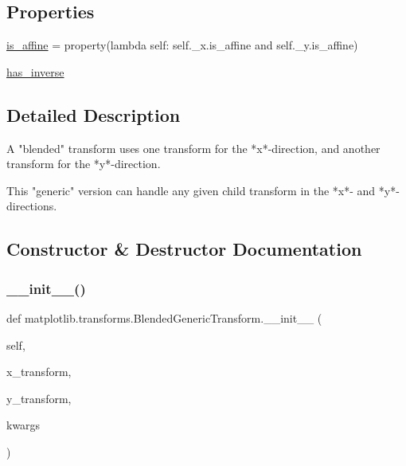 \subsection*{Properties}
\begin{DoxyCompactItemize}
\item 
\hyperlink{classmatplotlib_1_1transforms_1_1BlendedGenericTransform_a96ce5f24de76a1b9abf60d173df41fe6}{is\+\_\+affine} = property(lambda self\+: self.\+\_\+x.\+is\+\_\+affine and self.\+\_\+y.\+is\+\_\+affine)
\item 
\hyperlink{classmatplotlib_1_1transforms_1_1BlendedGenericTransform_a5f3980d472ea7915057f2fc82492d463}{has\+\_\+inverse}
\end{DoxyCompactItemize}


\subsection{Detailed Description}
\begin{DoxyVerb}A "blended" transform uses one transform for the *x*-direction, and
another transform for the *y*-direction.

This "generic" version can handle any given child transform in the
*x*- and *y*-directions.
\end{DoxyVerb}
 

\subsection{Constructor \& Destructor Documentation}
\mbox{\label{classmatplotlib_1_1transforms_1_1BlendedGenericTransform_a740fed126c92a23be0cf06f4cbc62e3d}} 
\subsubsection{\texorpdfstring{\+\_\+\+\_\+init\+\_\+\+\_\+()}{\_\_init\_\_()}}
{\footnotesize\ttfamily def matplotlib.\+transforms.\+Blended\+Generic\+Transform.\+\_\+\+\_\+init\+\_\+\+\_\+ (\begin{DoxyParamCaption}\item[{}]{self,  }\item[{}]{x\+\_\+transform,  }\item[{}]{y\+\_\+transform,  }\item[{}]{kwargs }\end{DoxyParamCaption})}

